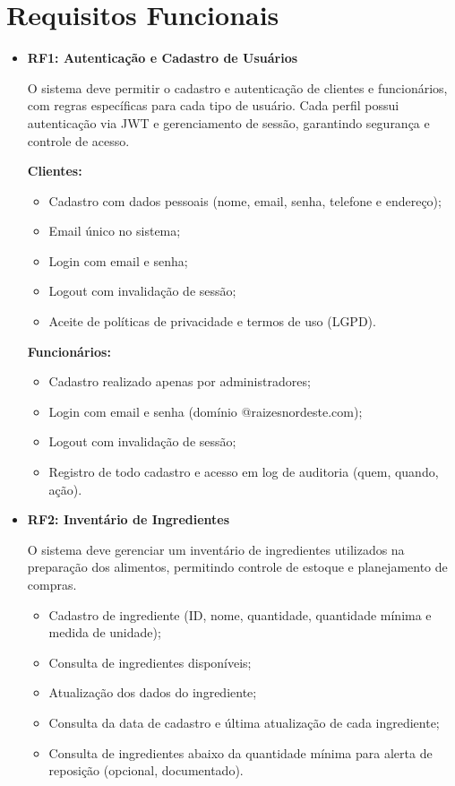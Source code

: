 \section{Requisitos Funcionais}

\begin{itemize}
  \item \textbf{RF1: Autenticação e Cadastro de Usuários}

  O sistema deve permitir o cadastro e autenticação de clientes e funcionários, com regras específicas para cada tipo de usuário.
  Cada perfil possui autenticação via JWT e gerenciamento de sessão, garantindo segurança e controle de acesso.

  \textbf{Clientes:}
  \begin{itemize}[topsep=0pt, itemsep=0pt]
    \item Cadastro com dados pessoais (nome, email, senha, telefone e endereço);
    \item Email único no sistema;
    \item Login com email e senha;
    \item Logout com invalidação de sessão;
    \item Aceite de políticas de privacidade e termos de uso (LGPD).
  \end{itemize}

  \textbf{Funcionários:}
  \begin{itemize}[topsep=0pt, itemsep=0pt]
    \item Cadastro realizado apenas por administradores;
    \item Login com email e senha (domínio @raizesnordeste.com);
    \item Logout com invalidação de sessão;
    \item Registro de todo cadastro e acesso em log de auditoria (quem, quando, ação).
  \end{itemize}
\end{itemize}

\begin{itemize}
  \item \textbf{RF2: Inventário de Ingredientes}

  O sistema deve gerenciar um inventário de ingredientes utilizados na preparação dos alimentos, permitindo controle de estoque e planejamento de compras.

  \begin{itemize}[topsep=0pt, itemsep=0pt]
    \item Cadastro de ingrediente (ID, nome, quantidade, quantidade mínima e medida de unidade);
    \item Consulta de ingredientes disponíveis;
    \item Atualização dos dados do ingrediente;
    \item Consulta da data de cadastro e última atualização de cada ingrediente;
    \item Consulta de ingredientes abaixo da quantidade mínima para alerta de reposição (opcional, documentado).
  \end{itemize}
\end{itemize}

